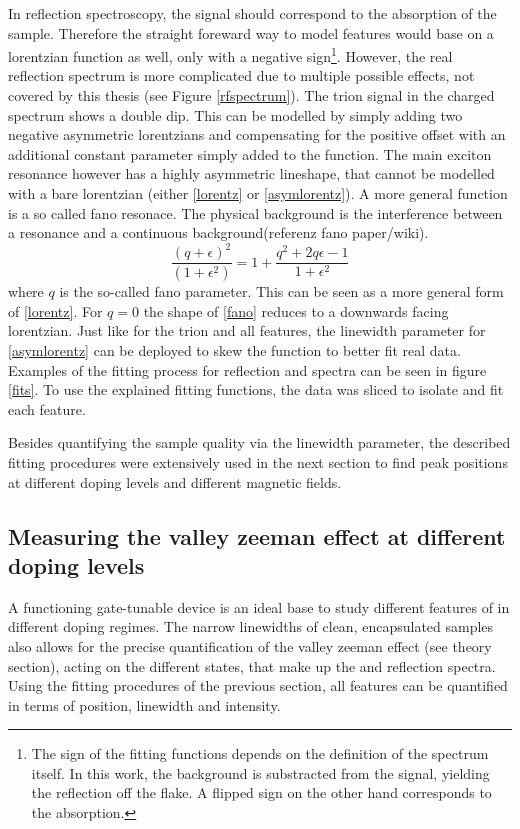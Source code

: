In reflection spectroscopy, the signal should correspond to the absorption of the sample. Therefore the straight foreward way to model features would base on a lorentzian function as well, only with a negative sign\footnote{The sign of the fitting functions depends on the definition of the spectrum itself. In this work, the background is substracted from the signal, yielding the reflection off the flake. A flipped sign on the other hand corresponds to the absorption.}. However, the real reflection spectrum is more complicated due to multiple possible effects, not covered by this thesis (see Figure \ref{rfspectrum}). The trion signal in the charged spectrum shows a double dip. This can be modelled by simply adding two negative asymmetric lorentzians and compensating for the positive offset with an additional constant parameter simply added to the function. The main exciton resonance however has a highly asymmetric lineshape, that cannot be modelled with a bare lorentzian (either \eqref{lorentz} or \eqref{asymlorentz}). A more general function is a so called fano resonace. The physical background is the interference between a resonance and a continuous background(referenz fano paper/wiki). 
\begin{equation}
\frac{(q+\epsilon)^2}{(1+\epsilon^2)} = 1 + \frac{q^2+2q\epsilon-1}{1+\epsilon^2}\label{fano}
\end{equation}
where $q$ is the so-called fano parameter. This can be seen as a more general form of \eqref{lorentz}. For $q=0$ the shape of \eqref{fano} reduces to a downwards facing lorentzian. Just like for the trion and all \pl features, the linewidth parameter for \eqref{asymlorentz} can be deployed to skew the function to better fit real data.
Examples of the fitting process for reflection and \pl spectra can be seen in figure \ref{fits}. To use the explained fitting functions, the data was sliced to isolate and fit each feature. 

Besides quantifying the sample quality via the linewidth parameter, the described fitting procedures were extensively used in the next section to find peak positions at different doping levels and different magnetic fields.

\subsection{Measuring the valley zeeman effect at different doping levels}

A functioning gate-tunable device is an ideal base to study different features of \tmds in different doping regimes. The narrow linewidths of clean, \hbng encapsulated \wse samples also allows for the precise quantification of the valley zeeman effect (see theory section), acting on the different states, that make up the \pl and reflection spectra. Using the fitting procedures of the previous section, all features can be quantified in terms of position, linewidth and intensity.

